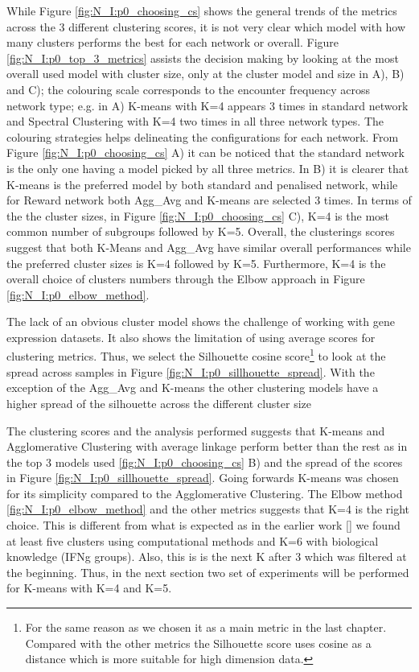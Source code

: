 While Figure \ref{fig:N_I:p0_choosing_cs} shows the general trends of the metrics across the 3 different clustering scores, it is not very clear which model with how many clusters performs the best for each network or overall. Figure \ref{fig:N_I:p0_top_3_metrics} assists the decision making by looking at the most overall used model with cluster size, only at the cluster model and size in A), B) and C); the colouring scale corresponds to the encounter frequency across network type; e.g. in A) K-means with K=4 appears 3 times in standard network and Spectral Clustering with K=4 two times in all three network types. The colouring strategies helps delineating the configurations for each network. From Figure \ref{fig:N_I:p0_choosing_cs} A) it can be noticed that the standard network is the only one having a model picked by all three metrics. In B) it is clearer that K-means is the preferred model by both standard and penalised network, while for Reward network both Agg\_Avg and K-means are selected 3 times. In terms of the the cluster sizes, in Figure \ref{fig:N_I:p0_choosing_cs} C), K=4 is the most common number of subgroups followed by K=5. Overall, the clusterings scores suggest that both K-Means and Agg\_Avg have similar overall performances while the preferred cluster sizes is K=4 followed by K=5. Furthermore, K=4 is the overall choice of clusters numbers through the Elbow approach in Figure \ref{fig:N_I:p0_elbow_method}.


The lack of an obvious cluster model shows the challenge of working with gene expression datasets. It also shows the limitation of using average scores for clustering metrics. Thus, we select the Silhouette cosine score\footnote{For the same reason as we chosen it as a main metric in the last chapter. Compared with the other metrics the Silhouette score uses cosine as a distance which is more suitable for high dimension data.} to look at the spread across samples in Figure \ref{fig:N_I:p0_sillhouette_spread}. With the exception of the Agg\_Avg and K-means the other clustering models have a higher spread of the silhouette across the different cluster size

The clustering scores and the analysis performed suggests that K-means and Agglomerative Clustering with average linkage perform better than the rest as in the top 3 models used \ref{fig:N_I:p0_choosing_cs} B) and the spread of the scores in Figure \ref{fig:N_I:p0_sillhouette_spread}. Going forwards K-means was chosen for its simplicity compared to the Agglomerative Clustering. The Elbow method \ref{fig:N_I:p0_elbow_method} and the other metrics suggests that K=4 is the right choice. This is different from what is expected as in the earlier work \ref{} we found at least five clusters using computational methods and K=6 with biological knowledge (IFNg groups). Also, this is is the next K after 3 which was filtered at the beginning. Thus, in the next section two set of experiments will be performed for K-means with K=4 and K=5. 


